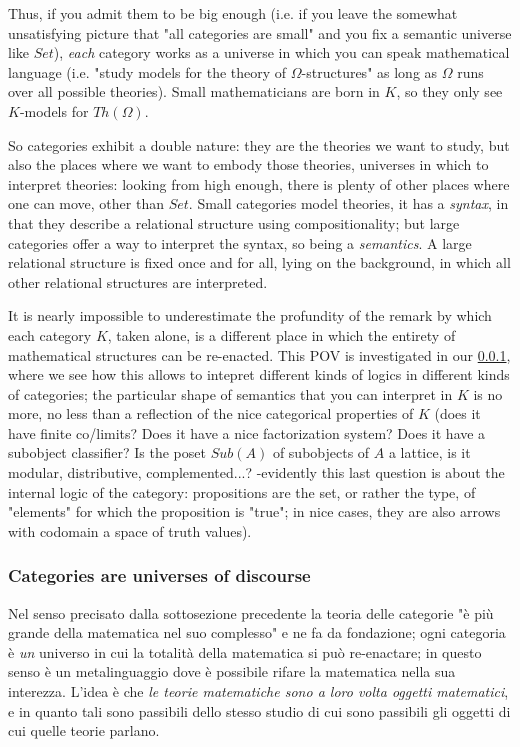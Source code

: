 \documentclass{amsart}
\begin{document}
Thus, if you admit them to be big enough (i.e. if you leave the somewhat unsatisfying picture that "all categories are small" and you fix a semantic universe like $Set$), \emph{each} category works as a universe in which you can speak mathematical language (i.e. "study models for the theory of $\Omega$-structures" as long as $\Omega$ runs over all possible theories). Small mathematicians are born in $K$, so they only see $K$-models for $Th(\Omega)$.

So categories exhibit a double nature: they are the theories we want to study, but also the places where we want to embody those theories, universes in which to interpret theories: looking from high enough, there is plenty of other places where one can move, other than $Set$. Small categories model theories, it has a \emph{syntax}, in that they describe a relational structure using compositionality; but large categories offer a way to interpret the syntax, so being a \emph{semantics}. A large relational structure is fixed once and for all, lying on the background, in which all other relational structures are interpreted.

It is nearly impossible to underestimate the profundity of the remark by which each category $K$, taken alone, is a different place in which the entirety of mathematical structures can be re-enacted. This POV is investigated in our \ref{}, where we see how this allows to intepret different kinds of logics in different kinds of categories; the particular shape of semantics that you can interpret in $K$ is no more, no less than a reflection of the nice categorical properties of $K$ (does it have finite co/limits? Does it have a nice factorization system? Does it have a subobject classifier? Is the poset $Sub(A)$ of subobjects of $A$ a lattice, is it modular, distributive, complemented...? -evidently this last question is about the internal logic of the category: propositions are the set, or rather the type, of "elements" for which the proposition is "true"; in nice cases, they are also arrows with codomain a space of truth values).
\subsubsection{Categories are universes of discourse}
Nel senso precisato dalla sottosezione precedente la teoria delle categorie "è più grande della matematica nel suo complesso" e ne fa da fondazione; ogni categoria è \emph{un} universo in cui la totalità della matematica si può re-enactare; in questo senso è un metalinguaggio dove è possibile rifare la matematica nella sua interezza. L'idea è che \emph{le teorie matematiche sono a loro volta oggetti matematici}, e in quanto tali sono passibili dello stesso studio di cui sono passibili gli oggetti di cui quelle teorie parlano.
\end{document}

